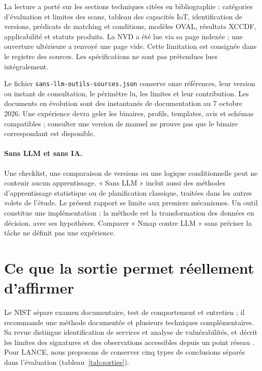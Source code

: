 \documentclass[11pt,a4paper]{article}
\begin{document}
La lecture a porté sur les sections techniques citées en bibliographie : catégories d'évaluation et limites des scans, tableau des capacités IoT, identification de versions, prédicats de matching et conditions, modèles OVAL, résultats XCCDF, applicabilité et statuts produits. La NVD a été lue via sa page indexée ; une ouverture ultérieure a renvoyé une page vide. Cette limitation est consignée dans le registre des sources. Les spécifications ne sont pas prétendues lues intégralement.

Le fichier \texttt{sans-llm-outils-sources.json} conserve onze références, leur version ou instant de consultation, le périmètre lu, les limites et leur contribution. Les documents en évolution sont des instantanés de documentation au 7 octobre 2026. Une expérience devra geler les binaires, profils, templates, avis et schémas compatibles ; consulter une version de manuel ne prouve pas que le binaire correspondant est disponible.

\paragraph{Sans LLM et sans IA.}
Une checklist, une comparaison de versions ou une logique conditionnelle peut ne contenir aucun apprentissage. « Sans LLM » inclut aussi des méthodes d'apprentissage statistique ou de planification classique, traitées dans les autres volets de l'étude. Le présent rapport se limite aux premiers mécanismes. Un outil constitue une implémentation ; la méthode est la transformation des données en décision, avec ses hypothèses. Comparer « Nmap contre LLM » sans préciser la tâche ne définit pas une expérience.

\section{Ce que la sortie permet réellement d'affirmer}
Le NIST sépare examen documentaire, test de comportement et entretien ; il recommande une méthode documentée et plusieurs techniques complémentaires. Sa revue distingue identification de services et analyse de vulnérabilités, et décrit les limites des signatures et des observations accessibles depuis un point réseau \cite{nist115}. Pour LANCE, nous proposons de conserver cinq types de conclusions séparés dans l'évaluation (tableau~\ref{tab:sorties}).
\end{document}
